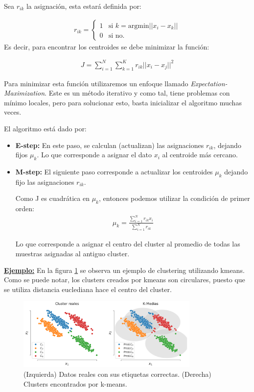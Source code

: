 Sea $r_{ik}$ la asignación, esta estará definida por:

\begin{align*}
r_{ik} = \begin{cases}
1 & \text{si } k = \text{argmin}||x_i-x_k||\\
0 & \text{si no.}
\end{cases}
\end{align*}
Es decir, para encontrar los centroides se debe minimizar la función:

\begin{align}
J = \sum_{i=1}^N \sum_{k=1}^K r_{ik} ||x_i-x_j||^2
\end{align}

Para minimizar esta función utilizaremos un enfoque llamado \emph{Expectation-Maximization}. Este es un método iterativo y como tal, tiene problemas con mínimo locales, pero para solucionar esto, basta inicializar el algoritmo muchas veces.

El algoritmo está dado por:

\begin{itemize}
    \item \textbf{E-step:} En este paso, se calculan (actualizan) las asignaciones $r_{ik}$, dejando fijos $\mu_k$. Lo que corresponde a asignar el dato $x_i$ al centroide más cercano.
    \item \textbf{M-step:} El siguiente paso corresponde a actualizar los centroides $\mu_k$ dejando fijo las asignaciones $r_{ik}$.
    
    Como J es cuadrática en $\mu_k$, entonces podemos utilizar la condición de primer orden:
    \begin{align}
        \mu_k = \frac{\sum_{i=1}^N r_{ik}x_i}{\sum_{i=1}^N r_{ik}}
    \end{align}
    
    Lo que corresponde a asignar el centro del cluster al promedio de todas las muestras asignadas al antiguo cluster.
\end{itemize}

\underline{\textbf{Ejemplo:}} En la figura \ref{fig:kmeans} se observa un ejemplo de clustering utilizando kmeans. Como se puede notar, los clusters creados por kmeans son circulares, puesto que se utiliza distancia euclediana hace el centro del cluster.

\begin{figure}[ht]
  \centering
  \includegraphics[width=0.8\textwidth]{img/cap7_k_medias}
  \caption{(Izquierda) Datos reales con sus etiquetas correctas. (Derecha) Clusters encontrados por k-means.}
  \label{fig:kmeans}
\end{figure}



